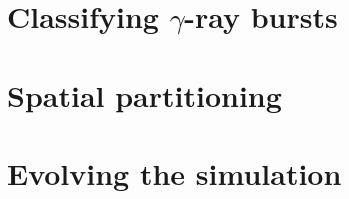 \documentclass[10pt]{article}
\begin{document}


%

%

%

%

%

\section{Classifying $\gamma$-ray bursts}



\section{Spatial partitioning}



\section{Evolving the simulation}


\end{document}
